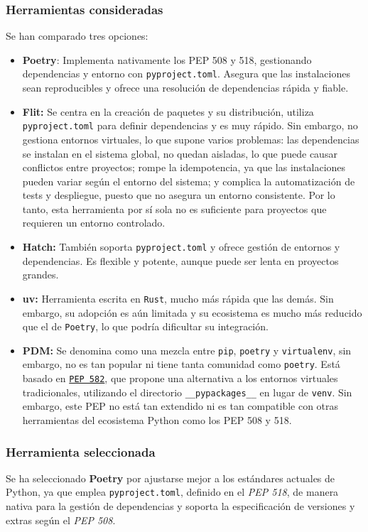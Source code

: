 \subsubsection{Herramientas consideradas}
Se han comparado tres opciones:
\begin{itemize}
    \item \textbf{Poetry}: Implementa nativamente los PEP 508 y 518, gestionando dependencias
    y entorno con \texttt{pyproject.toml}. Asegura que las instalaciones sean reproducibles y
    ofrece una resolución de dependencias rápida y fiable.
    \item \textbf{Flit:} Se centra en la creación de paquetes y su distribución, utiliza
    \texttt{pyproject.toml} para definir dependencias y es muy rápido. Sin embargo, no gestiona
    entornos virtuales, lo que supone varios problemas: las dependencias se instalan  en el sistema
    global, no quedan aisladas, lo que puede causar conflictos entre proyectos; rompe la idempotencia,
    ya que las instalaciones pueden variar según el entorno del sistema; y complica la automatización
    de tests y despliegue, puesto que no asegura un entorno consistente. Por lo tanto, esta herramienta por
    sí sola no es suficiente para proyectos que requieren un entorno controlado.
    \item \textbf{Hatch:} También soporta \texttt{pyproject.toml} y ofrece gestión de entornos
    y dependencias. Es flexible y potente, aunque puede ser lenta en proyectos grandes. 
    \item \textbf{uv: } Herramienta escrita en \texttt{Rust}, mucho más rápida que las demás.
    Sin embargo, su adopción es aún limitada y su ecosistema es mucho más reducido que el de
    \texttt{Poetry}, lo que podría dificultar su integración.
    \item \textbf{PDM: } Se denomina como una mezcla entre \texttt{pip}, \texttt{poetry} y 
    \texttt{virtualenv}, sin embargo, no es tan popular ni tiene tanta comunidad como \texttt{poetry}.
    Está basado en \texttt{\href{https://peps.python.org/pep-0582/}{PEP 582}}, que propone una alternativa a los entornos virtuales tradicionales,
    utilizando el directorio \texttt{\_\_pypackages\_\_} en lugar de \texttt{venv}. Sin embargo,
    este PEP no está tan extendido ni es tan compatible con otras herramientas del ecosistema
    Python como los PEP 508 y 518.
\end{itemize}

\subsubsection{Herramienta seleccionada}
Se ha seleccionado \textbf{Poetry} por ajustarse mejor a los estándares actuales de Python, ya
que emplea \texttt{pyproject.toml}, definido en el \textit{PEP 518}, de manera nativa para la
gestión de dependencias y soporta la especificación de versiones y extras según el \textit{PEP 508}.


